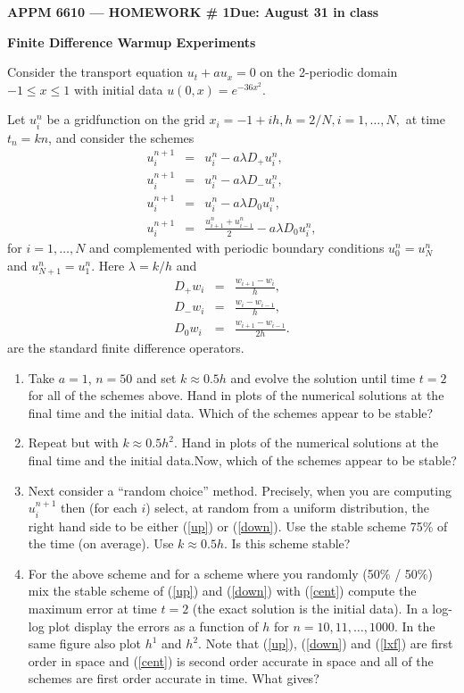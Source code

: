 \documentclass[11pt]{article}
\begin{document}
\begin{center}
\textbf{APPM 6610 --- HOMEWORK  \# 1\hfill Due: August 31 in class}
\end{center}

\begin{center}
{\bf Finite Difference Warmup Experiments}
\end{center}

Consider the transport equation $u_t+au_x = 0$ on the 2-periodic domain $-1 \le x \le 1$ with initial data $u(0,x) = e^{-36x^2}$.

Let $u_i^n$ be a gridfunction on the grid $x_i = -1+i h, h = 2/N, i = 1,\ldots,N,$ at time $t_n = kn$, and consider the schemes 
\begin{eqnarray}
u^{n+1}_i &=& u^n_i - a\lambda D_+ u^n_i, \label{up}\\
u^{n+1}_i &=& u^n_i - a\lambda D_- u^n_i, \label{down} \\
u^{n+1}_i &=& u^n_i - a\lambda D_0 u^n_i, \label{cent} \\
u^{n+1}_i &=& \frac{u^n_{i+1}+u^n_{i-1}}{2} - a\lambda D_0 u^n_i, \label{lxf}
\end{eqnarray}
for $i = 1,\ldots,N$ and complemented with periodic boundary conditions $u^n_0 = u^n_N$ and $u^n_{N+1} = u^n_1$. Here $\lambda = k/h$ and    
\begin{eqnarray*}
D_+ w_{i} &=& \frac{w_{i+1}-w_{i}}{h}, \\
D_- w_{i} &=& \frac{w_{i}-w_{i-1}}{h}, \\
D_0 w_{i} &=& \frac{w_{i+1}-w_{i-1}}{2h}.
\end{eqnarray*}
are the standard finite difference operators. 

\begin{enumerate}
\item Take $a = 1$, $n=50$ and set $k \approx 0.5h $ and evolve the solution until time $t = 2$ for all of the schemes above. Hand in plots of the numerical solutions at the final time and the initial data. Which of the schemes appear to be stable?  
\item Repeat but with $k \approx 0.5h^2 $. Hand in plots of the numerical solutions at the final time and the initial data.Now, which of the schemes appear to be stable?  
\item  Next consider a ``random choice'' method. Precisely, when you are computing $u^{n+1}_i$ then (for each $i$) select, at random from a uniform distribution, the right hand side to be either (\ref{up}) or (\ref{down}). Use the stable scheme 75\% of the time (on average). Use $k\approx 0.5h$. Is this scheme stable? 
\item For the above scheme and for a scheme where you randomly (50\% / 50\%) mix the stable scheme of (\ref{up}) and (\ref{down}) with (\ref{cent}) compute the maximum error at time $t=2$ (the exact solution is the initial data). In a log-log plot display the errors as a function of $h$ for $n = 10,11,\ldots, 1000$. In the same figure also plot $h^1$ and $h^2$. Note that (\ref{up}), (\ref{down}) and (\ref{lxf}) are first order in space and (\ref{cent}) is second order accurate in space and all of the schemes are first order accurate in time. What gives?   
\end{enumerate}
\end{document}
